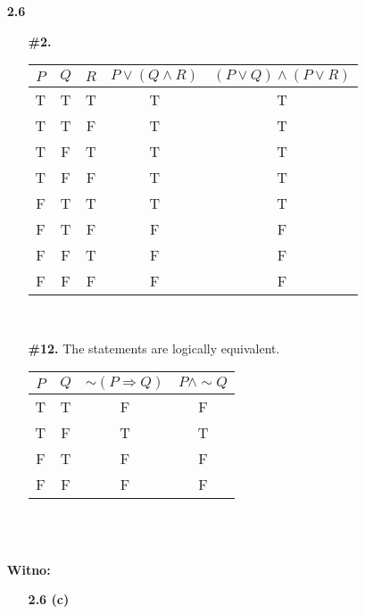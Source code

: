\documentclass[16pt]{article}
\begin{document}
\begin{enumerate}
    \item[\textbf{2.6  }]
    \begin{enumerate}
        \item[]
        \item[\textbf{\#2.}]
        \begin{tabular}{|c|c|c|c|c|}
            \hline
            $P$ & $Q$ & $R$ & $P\lor (Q\land R)$ & $(P\lor Q)\land (P\lor R)$\\
            \hline
            T & T & T & T & T\\ 
            \hline
            T & T & F & T & T\\ 
            \hline
            T & F & T & T & T\\ 
            \hline
            T & F & F & T & T\\
            \hline
            F & T & T & T & T\\
            \hline
            F & T & F & F & F\\
            \hline
            F & F & T & F & F\\
            \hline
            F & F & F & F & F\\
            \hline
        \end{tabular}
        \\
        \item[\textbf{\#12.}] The statements are logically equivalent. \\
        \begin{tabular}{|c|c|c|c|}
            \hline
            $P$ & $Q$ & $\sim (P\Rightarrow Q)$ & $P\land \sim Q$\\
            \hline
            T & T & F & F \\
            \hline
            T & F & T & T \\
            \hline
            F & T & F & F \\ 
            \hline
            F & F & F & F \\
            \hline
        \end{tabular}
    \end{enumerate}
    \\ \\
    \item[\textbf{Witno:  }] \\
    \begin{enumerate}
    \item[]
        \item[\textbf{2.6 (c)}]
        \begin{tabular}{|c|c|c|c|}

\end{tabular}
\end{enumerate}
\end{enumerate}
\end{document}
